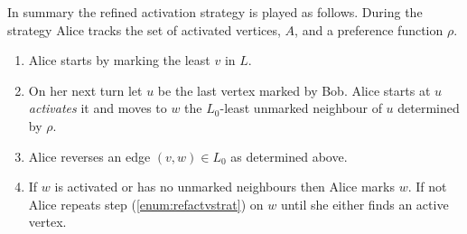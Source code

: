 In summary the refined activation strategy is played as follows. During the strategy Alice tracks the set of activated vertices, $A$, and a preference function $\rho$.  
\begin{enumerate}
    \item Alice starts by marking the least $v$ in $L$.
    \item On her next turn let $u$ be the last vertex marked by Bob. Alice starts at $u$ \textit{activates} it and moves to $w$ the $L_0$-least unmarked neighbour of $u$ determined by $\rho$. \label{enum:refactvstrat}
    \item Alice reverses an edge $(v,w)\in L_0$ as determined above. 
    \item If $w$ is activated or has no unmarked neighbours then Alice marks $w$. If not Alice repeats step (\ref{enum:refactvstrat}) on $w$ until she either finds an active vertex.
\end{enumerate}












